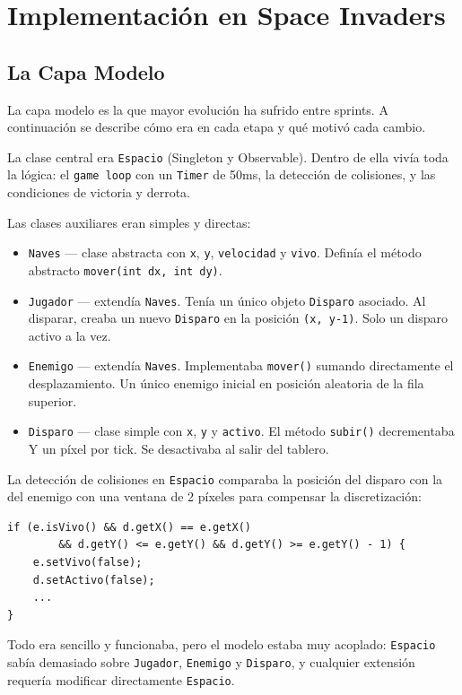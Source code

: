 \documentclass[12pt, a4paper]{article}
\begin{document}
\section{Implementaci\'{o}n en Space Invaders}
 
\subsection{La Capa Modelo}
 
La capa modelo es la que mayor evoluci\'{o}n ha sufrido entre sprints. A continuaci\'{o}n se describe c\'{o}mo era en cada etapa y qu\'{e} motiv\'{o} cada cambio.
 
\begin{cajasprint1}
La clase central era \texttt{Espacio} (Singleton y Observable). Dentro de ella viv\'{i}a toda la l\'{o}gica: el \texttt{game loop} con un \texttt{Timer} de 50ms, la detecci\'{o}n de colisiones, y las condiciones de victoria y derrota.
 
Las clases auxiliares eran simples y directas:
\begin{itemize}
    \item \texttt{Naves} --- clase abstracta con \texttt{x}, \texttt{y}, \texttt{velocidad} y \texttt{vivo}. Defin\'{i}a el m\'{e}todo abstracto \texttt{mover(int dx, int dy)}.
    \item \texttt{Jugador} --- extend\'{i}a \texttt{Naves}. Ten\'{i}a un \'{u}nico objeto \texttt{Disparo} asociado. Al disparar, creaba un nuevo \texttt{Disparo} en la posici\'{o}n \texttt{(x, y-1)}. Solo un disparo activo a la vez.
    \item \texttt{Enemigo} --- extend\'{i}a \texttt{Naves}. Implementaba \texttt{mover()} sumando directamente el desplazamiento. Un \'{u}nico enemigo inicial en posici\'{o}n aleatoria de la fila superior.
    \item \texttt{Disparo} --- clase simple con \texttt{x}, \texttt{y} y \texttt{activo}. El m\'{e}todo \texttt{subir()} decrementaba Y un p\'{i}xel por tick. Se desactivaba al salir del tablero.
\end{itemize}
 
La detecci\'{o}n de colisiones en \texttt{Espacio} comparaba la posici\'{o}n del disparo con la del enemigo con una ventana de 2 p\'{i}xeles para compensar la discretizaci\'{o}n:
\begin{lstlisting}
if (e.isVivo() && d.getX() == e.getX()
        && d.getY() <= e.getY() && d.getY() >= e.getY() - 1) {
    e.setVivo(false);
    d.setActivo(false);
    ...
}
\end{lstlisting}
 
Todo era sencillo y funcionaba, pero el modelo estaba muy acoplado: \texttt{Espacio} sab\'{i}a demasiado sobre \texttt{Jugador}, \texttt{Enemigo} y \texttt{Disparo}, y cualquier extensi\'{o}n requer\'{i}a modificar directamente \texttt{Espacio}.
\end{cajasprint1}
 
\end{document}
